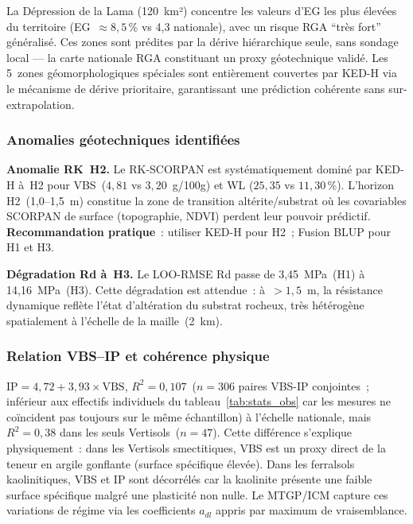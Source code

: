 \documentclass[10pt,a4paper,twocolumn]{article}
\begin{document}
	La Dépression de la Lama (120~km²) concentre les valeurs d'EG
	les plus élevées du territoire (EG~$\approx8{,}5$\,\% vs 4{,}3
	nationale), avec un risque RGA ``très fort'' généralisé.
	Ces zones sont prédites par la dérive hiérarchique seule, sans
	sondage local --- la carte nationale RGA constituant un proxy
	géotechnique validé. Les 5~zones géomorphologiques spéciales
	sont entièrement couvertes par KED-H via le mécanisme de dérive
	prioritaire, garantissant une prédiction cohérente sans sur-extrapolation.
	
	\subsubsection{Anomalies géotechniques identifiées}
	
	\textbf{Anomalie RK~H2.}
	Le RK-SCORPAN est systématiquement dominé par KED-H à~H2
	pour VBS~($4{,}81$ vs $3{,}20$~g/100g) et WL
	($25{,}35$ vs $11{,}30$\,\%).
	L'horizon H2~(1{,}0--1{,}5~m) constitue la zone de transition
	altérite/substrat où les covariables SCORPAN de surface
	(topographie, NDVI) perdent leur pouvoir prédictif.
	\textbf{Recommandation pratique}~: utiliser KED-H pour H2~;
	Fusion BLUP pour H1 et H3.
	
	\textbf{Dégradation Rd à~H3.}
	Le LOO-RMSE Rd passe de 3{,}45~MPa~(H1) à 14{,}16~MPa~(H3).
	Cette dégradation est attendue~: à~$>1{,}5$~m, la résistance
	dynamique reflète l'état d'altération du substrat rocheux, très
	hétérogène spatialement à l'échelle de la maille~(2~km).
	
	\subsubsection{Relation VBS--IP et cohérence physique}
	
	$\mathrm{IP}=4{,}72+3{,}93\times\mathrm{VBS}$,
	$R^2=0{,}107$~($n=306$ paires VBS-IP conjointes~; inférieur aux
	effectifs individuels du tableau~\ref{tab:stats_obs} car les mesures
	ne coïncident pas toujours sur le même échantillon) à l'échelle
	nationale, mais $R^2=0{,}38$ dans les seuls Vertisols~($n=47$).
	Cette différence s'explique physiquement~: dans les Vertisols
	smectitiques, VBS est un proxy direct de la teneur en argile
	gonflante (surface spécifique élevée). Dans les ferralsols
	kaolinitiques, VBS et IP sont décorrélés car la kaolinite
	présente une faible surface spécifique malgré une plasticité
	non nulle. Le MTGP/ICM capture ces variations de régime
	via les coefficients $a_{dl}$ appris par maximum de vraisemblance.
	
\end{document}

